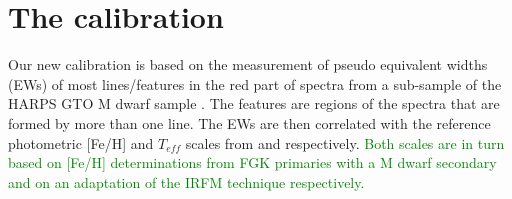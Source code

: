 \documentclass{aa}
\begin{document}








\section{The calibration}
\label{sec:calib}

Our new calibration is based on the measurement of pseudo equivalent widths (EWs) of most lines/features in the red part of spectra from a sub-sample of the HARPS GTO M dwarf sample \citep{Bonfils-2013}. The features are regions of the spectra that are formed by more than one line. The EWs are then correlated with the reference photometric [Fe/H] and $T_{eff}$ scales from \citet{Neves-2012} and \citet{Casagrande-2008} respectively. \textcolor{green}{Both scales are in turn based on [Fe/H] determinations from FGK primaries with a M dwarf secondary and on an adaptation of the IRFM technique \citet{Blackwell-1977} respectively.}
\end{document}
